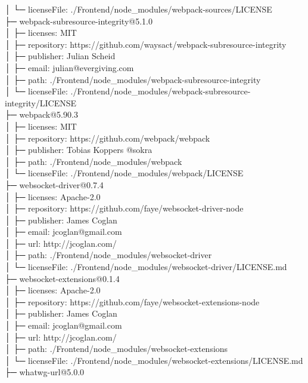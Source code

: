 │  └─ licenseFile: ./Frontend/node\_modules/webpack-sources/LICENSE\\
├─ webpack-subresource-integrity@5.1.0\\
│  ├─ licenses: MIT\\
│  ├─ repository: https://github.com/waysact/webpack-subresource-integrity\\
│  ├─ publisher: Julian Scheid\\
│  ├─ email: julian@evergiving.com\\
│  ├─ path: ./Frontend/node\_modules/webpack-subresource-integrity\\
│  └─ licenseFile: ./Frontend/node\_modules/webpack-subresource-integrity/LICENSE\\
├─ webpack@5.90.3\\
│  ├─ licenses: MIT\\
│  ├─ repository: https://github.com/webpack/webpack\\
│  ├─ publisher: Tobias Koppers @sokra\\
│  ├─ path: ./Frontend/node\_modules/webpack\\
│  └─ licenseFile: ./Frontend/node\_modules/webpack/LICENSE\\
├─ websocket-driver@0.7.4\\
│  ├─ licenses: Apache-2.0\\
│  ├─ repository: https://github.com/faye/websocket-driver-node\\
│  ├─ publisher: James Coglan\\
│  ├─ email: jcoglan@gmail.com\\
│  ├─ url: http://jcoglan.com/\\
│  ├─ path: ./Frontend/node\_modules/websocket-driver\\
│  └─ licenseFile: ./Frontend/node\_modules/websocket-driver/LICENSE.md\\
├─ websocket-extensions@0.1.4\\
│  ├─ licenses: Apache-2.0\\
│  ├─ repository: https://github.com/faye/websocket-extensions-node\\
│  ├─ publisher: James Coglan\\
│  ├─ email: jcoglan@gmail.com\\
│  ├─ url: http://jcoglan.com/\\
│  ├─ path: ./Frontend/node\_modules/websocket-extensions\\
│  └─ licenseFile: ./Frontend/node\_modules/websocket-extensions/LICENSE.md\\
├─ whatwg-url@5.0.0\\
